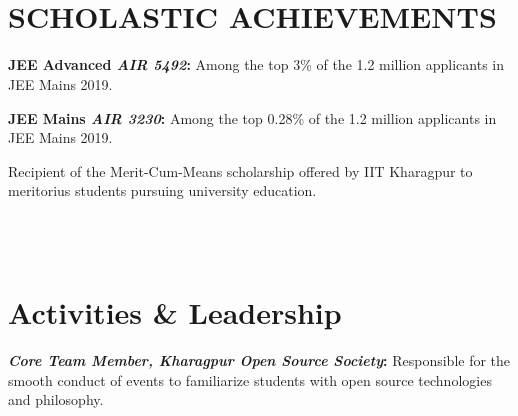 \documentclass[]{deedy-resume-openfont}
\begin{document}
\begin{minipage}[t]{0.66\textwidth}
\\~\\

\section{SCHOLASTIC ACHIEVEMENTS}

\vspace{\topsep} %
\begin{tightemize}

\item\textbf{{JEE Advanced \emph{AIR 5492}:}} Among the top 3\% of the 1.2 million applicants in JEE Mains 2019.
\vspace{\topsep} %
\item\textbf{{JEE Mains \emph{AIR 3230}:}} Among the top 0.28\% of the 1.2 million applicants in JEE Mains 2019. 
\vspace{\topsep} %
\item Recipient of the Merit-Cum-Means scholarship offered by IIT Kharagpur to meritorius students pursuing university education.
\end{tightemize}

\\~\\


\section{Activities \& Leadership}

\vspace{\topsep} %
\begin{tightemize}


\item \textbf{{\emph{Core Team Member, Kharagpur Open Source Society}:}} Responsible for the smooth conduct of events to familiarize students with open source technologies and philosophy.
\vspace{\topsep} %

\vspace{\topsep} %

\end{tightemize}
\sectionsep

\end{minipage} 
\end{document}
